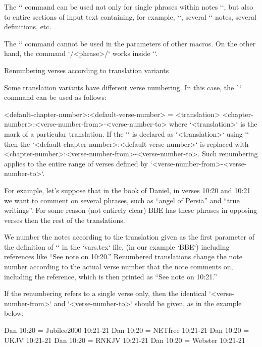 The `\switch` command can be used not only for single phrases within notes
`\Note`, but also to entire sections of input text containing, for example, `\Note`,
several `\Note` notes, several definitions, etc.

The `\switch` command cannot be used in the parameters of other macros. On the other hand, the
command `\x/<phrase>/` works inside `\switch`.




\secc[renum] Renumbering verses according to translation variants

Some translation variants have different verse numbering. In this case, the
\`\renum` command can be used as follows:

\begtt
{} <default-chapter-number>:<default-verse-number> = <translation> 
<chapter-number>:<verse-number-from>-<verse-number-to>
\endtt
where `<translation>` is the mark of a particular translation. If the `\tmark` is declared as `<translation>` using `\def\tmark{<translation>}` then
the `<default-chapter-number>:<default-verse-number>`  is replaced with
<chapter-number>:<verse-number-from>-<verse-number-to>.
Such renumbering applies to the entire range of verses defined by `<verse-number-from>-<verse-number-to>`.

For example, let's suppose that
in the book of Daniel, in verses 10:20 and 10:21 we want to comment on several phrases, such as 
“angel of Persia” and “true writings”. For some reason (not entirely clear) BBE has these phrases in 
opposing verses then the rest of the translations.

We number the notes according to the translation given as the first parameter of the definition of 
`\variants` in the `vars.tex` file, (in our example `BBE`) including references like “See note on 
10:20.”
Renumbered translations change the note number according to the actual verse number that the note 
comments on, including the reference, which is then printed as “See note on 10:21.”

If the renumbering refers to a single verse only, then the identical 
`<verse-number-from>` and `<verse-number-to>`  should be given, as in the example below:

\begtt
\renum Dan 10:20 = Jubilee2000 10:21-21
\renum Dan 10:20 = NETfree 10:21-21
\renum Dan 10:20 = UKJV 10:21-21
\renum Dan 10:20 = RNKJV 10:21-21
\renum Dan 10:20 = Webster 10:21-21
\endtt



